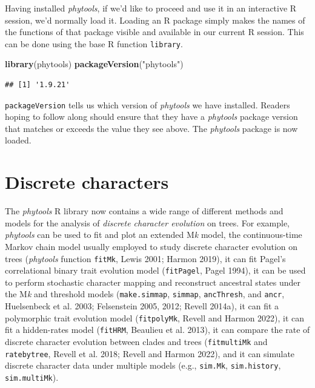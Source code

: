 \documentclass[fleqn,10pt,lineno]{wlpeerj} %
\newenvironment{Shaded}{\begin{snugshade}}{\end{snugshade}}
\newcommand{\FunctionTok}[1]{\textcolor[rgb]{0.13,0.29,0.53}{\textbf{#1}}}
\newcommand{\NormalTok}[1]{#1}
\newcommand{\StringTok}[1]{\textcolor[rgb]{0.31,0.60,0.02}{#1}}
\begin{document}
Having installed \emph{phytools}, if we'd like to proceed and use it in an interactive R session, we'd normally load it. Loading an R package simply makes the names of the functions of that package visible and available in our current R session. This can be done using the base R function \texttt{library}.

\begin{Shaded}
\begin{Highlighting}[]
\FunctionTok{library}\NormalTok{(phytools)}
\FunctionTok{packageVersion}\NormalTok{(}\StringTok{"phytools"}\NormalTok{)}
\end{Highlighting}
\end{Shaded}

\begin{verbatim}
## [1] '1.9.21'
\end{verbatim}

\texttt{packageVersion} tells us which version of \emph{phytools} we have installed. Readers hoping to follow along should ensure that they have a \emph{phytools} package version that matches or exceeds the value they see above. The \emph{phytools} package is now loaded.

\hypertarget{discrete-characters}{%
\section{Discrete characters}\label{discrete-characters}}

The \emph{phytools} R library now contains a wide range of different methods and models for the analysis of \emph{discrete character evolution} on trees. For example, \emph{phytools} can be used to fit and plot an extended M\emph{k} model, the continuous-time Markov chain model usually employed to study discrete character evolution on trees (\emph{phytools} function \texttt{fitMk}, Lewis 2001; Harmon 2019), it can fit Pagel's correlational binary trait evolution model (\texttt{fitPagel}, Pagel 1994), it can be used to perform stochastic character mapping and reconstruct ancestral states under the M\emph{k} and threshold models (\texttt{make.simmap}, \texttt{simmap}, \texttt{ancThresh}, and \texttt{ancr}, Huelsenbeck et al. 2003; Felsenstein 2005, 2012; Revell 2014a), it can fit a polymorphic trait evolution model (\texttt{fitpolyMk}, Revell and Harmon 2022), it can fit a hidden-rates model (\texttt{fitHRM}, Beaulieu et al. 2013), it can compare the rate of discrete character evolution between clades and trees (\texttt{fitmultiMk} and \texttt{ratebytree}, Revell et al. 2018; Revell and Harmon 2022), and it can simulate discrete character data under multiple models (e.g., \texttt{sim.Mk}, \texttt{sim.history}, \texttt{sim.multiMk}).
\end{document}
